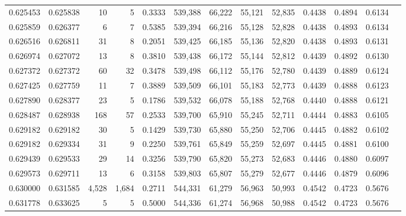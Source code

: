 \begin{tabular}{rrrrrrrrrrrrr}
0.625453 & 0.625838 &     10 &     5 &                                     0.3333 & 539,388 &  66,222 &  55,121 &  52,835 & 0.4438 & 0.4894 & 0.6134 \\
0.625859 & 0.626377 &      6 &     7 &                                     0.5385 & 539,394 &  66,216 &  55,128 &  52,828 & 0.4438 & 0.4893 & 0.6134 \\
0.626516 & 0.626811 &     31 &     8 &                                     0.2051 & 539,425 &  66,185 &  55,136 &  52,820 & 0.4438 & 0.4893 & 0.6131 \\
0.626974 & 0.627072 &     13 &     8 &                                     0.3810 & 539,438 &  66,172 &  55,144 &  52,812 & 0.4439 & 0.4892 & 0.6130 \\
0.627372 & 0.627372 &     60 &    32 &                                     0.3478 & 539,498 &  66,112 &  55,176 &  52,780 & 0.4439 & 0.4889 & 0.6124 \\
0.627425 & 0.627759 &     11 &     7 &                                     0.3889 & 539,509 &  66,101 &  55,183 &  52,773 & 0.4439 & 0.4888 & 0.6123 \\
0.627890 & 0.628377 &     23 &     5 &                                     0.1786 & 539,532 &  66,078 &  55,188 &  52,768 & 0.4440 & 0.4888 & 0.6121 \\
0.628487 & 0.628938 &    168 &    57 &                                     0.2533 & 539,700 &  65,910 &  55,245 &  52,711 & 0.4444 & 0.4883 & 0.6105 \\
0.629182 & 0.629182 &     30 &     5 &                                     0.1429 & 539,730 &  65,880 &  55,250 &  52,706 & 0.4445 & 0.4882 & 0.6102 \\
0.629182 & 0.629334 &     31 &     9 &                                     0.2250 & 539,761 &  65,849 &  55,259 &  52,697 & 0.4445 & 0.4881 & 0.6100 \\
0.629439 & 0.629533 &     29 &    14 &                                     0.3256 & 539,790 &  65,820 &  55,273 &  52,683 & 0.4446 & 0.4880 & 0.6097 \\
0.629573 & 0.629711 &     13 &     6 &                                     0.3158 & 539,803 &  65,807 &  55,279 &  52,677 & 0.4446 & 0.4879 & 0.6096 \\
0.630000 & 0.631585 &  4,528 & 1,684 &                                     0.2711 & 544,331 &  61,279 &  56,963 &  50,993 & 0.4542 & 0.4723 & 0.5676 \\
0.631778 & 0.633625 &      5 &     5 &                                     0.5000 & 544,336 &  61,274 &  56,968 &  50,988 & 0.4542 & 0.4723 & 0.5676 \\

\end{tabular}
